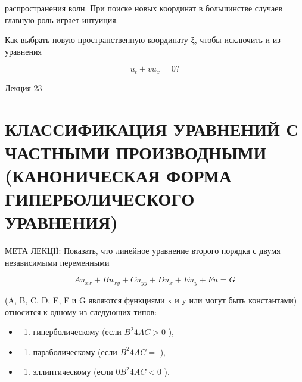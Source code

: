\documentclass[
  ukrainian,
]{article}
\providecommand{\tightlist}{%
  \setlength{\itemsep}{0pt}\setlength{\parskip}{0pt}}
\begin{document}
распространения волн. При поиске новых координат в большинстве случаев
главную роль играет интуиция.

Как выбрать новую пространственную координату ξ, чтобы исключить и из
уравнения

\[
u_t + vu_x = 0?
\]

Лекция 23

\section{КЛАССИФИКАЦИЯ УРАВНЕНИЙ С ЧАСТНЫМИ ПРОИЗВОДНЫМИ (КАНОНИЧЕСКАЯ
ФОРМА ГИПЕРБОЛИЧЕСКОГО
УРАВНЕНИЯ)}\label{ux43aux43bux430ux441ux441ux438ux444ux438ux43aux430ux446ux438ux44f-ux443ux440ux430ux432ux43dux435ux43dux438ux439-ux441-ux447ux430ux441ux442ux43dux44bux43cux438-ux43fux440ux43eux438ux437ux432ux43eux434ux43dux44bux43cux438-ux43aux430ux43dux43eux43dux438ux447ux435ux441ux43aux430ux44f-ux444ux43eux440ux43cux430-ux433ux438ux43fux435ux440ux431ux43eux43bux438ux447ux435ux441ux43aux43eux433ux43e-ux443ux440ux430ux432ux43dux435ux43dux438ux44f}

МЕТА ЛЕКЦІЇ: Показать, что линейное уравнение второго порядка с двумя
независимыми переменными

\[
Au_{xx} + Bu_{xy} + Cu_{yy} + Du_x + Eu_y + Fu = G
\]

(A, B, C, D, E, F и G являются функциями x и y или могут быть
константами) относится к одному из следующих типов:

\begin{itemize}
\tightlist
\item
  \begin{enumerate}
  \def\labelenumi{\arabic{enumi})}
  \tightlist
  \item
    гиперболическому (если \(B^2 4AC > 0\) ),
  \end{enumerate}
\item
  \begin{enumerate}
  \def\labelenumi{\arabic{enumi})}
  \setcounter{enumi}{1}
  \tightlist
  \item
    параболическому (если \(B^2 4AC =\) ),
  \end{enumerate}
\item
  \begin{enumerate}
  \def\labelenumi{\arabic{enumi})}
  \setcounter{enumi}{2}
  \tightlist
  \item
    эллиптическому (если \(0 B^2 4AC < 0\) ).
  \end{enumerate}
\end{itemize}
\end{document}
